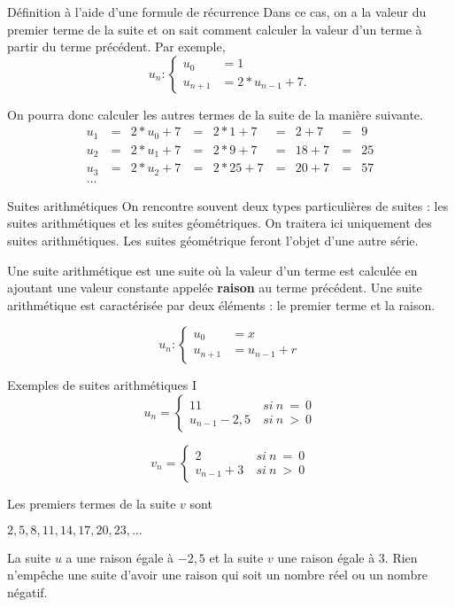 \documentclass{beamer}
\begin{document}
\begin{frame}{Définition à l'aide d'une formule de récurrence}
  Dans ce cas, on a la valeur du premier terme de la suite et on sait comment calculer la valeur d'un terme à partir du terme précédent. Par exemple,
  \[
    u_n :
    \begin{cases}
      u_0 &= 1 \\
      u_{n+1} &= 2 * u_{n-1} + 7.
    \end{cases}
  \]
  
  On pourra donc calculer les autres termes de la suite de la manière suivante.
  \begin{align*}
    u_1 & \ = & 2 * u_0 + 7 & \ = & 2 * 1 + 7  & \ = & 2 + 7  & \ = & 9  \\
    u_2 & \ = & 2 * u_1 + 7 & \ = & 2 * 9 + 7  & \ = & 18 + 7 & \ = & 25 \\
    u_3 & \ = & 2 * u_2 + 7 & \ = & 2 * 25 + 7 & \ = & 20 + 7 & \ = & 57 \\
    \dots & & & & & & & &
  \end{align*}
\end{frame}

\begin{frame}{Suites arithmétiques}
  On rencontre souvent deux types particulières de suites : les suites arithmétiques et les suites géométriques. On traitera ici uniquement des suites arithmétiques. Les suites géométrique feront l'objet d'une autre série.

  Une suite arithmétique est une suite où la valeur d'un terme est calculée en ajoutant une valeur constante appelée \textbf{raison} au terme précédent. Une suite arithmétique est caractérisée par deux éléments : le premier terme et la raison.
  
  \[
    u_n:
    \begin{cases}
      u_0 &= x \\
      u_{n+1} &= u_{n-1} + r
    \end{cases}
  \]
\end{frame}

\begin{frame}{Exemples de suites arithmétiques I}
  \[
    u_n =
    \begin{cases}
      11 & \ si\ n\ =\ 0 \\
      u_{n-1} - 2,5 &\ si\ n\ >\ 0
    \end{cases}
  \]
  
  \[
    v_n =
    \begin{cases}
      2 & \ si\ n\ =\ 0 \\
      v_{n-1} + 3 &\ si\ n\ >\ 0
    \end{cases}
  \]
  
  Les premiers termes de la suite $v$ sont
  \begin{center}
    $2, 5, 8, 11, 14, 17, 20, 23, \dots$
  \end{center}

  La suite $u$ a une raison égale à $-2,5$ et la suite $v$ une raison égale à $3$. Rien n'empêche une suite d'avoir une raison qui soit un nombre réel ou un nombre négatif.
\end{frame}
\end{document}

